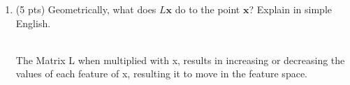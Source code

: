 \documentclass[a4paper]{article}
\theoremstyle{definition}
\def\x{\mathbf x}
\newenvironment{soln}{
    \leavevmode\color{blue}\ignorespaces
}{}
\begin{document}
\begin{enumerate}
\begin{soln}
As L is a diagonal matrix with diagonal $\sqrt{a_{11}}, \ldots, \sqrt{a_{dd}}$,

	\[
L=
  \begin{bmatrix}
    \sqrt{a_{11}} & 0 & 0 & \dots  & 0 \\
    0 & \sqrt{a_{22}} & 0 & \dots  & 0 \\
    \vdots & \vdots & \vdots & \ddots & \vdots \\
    0 & 0 & 0 & \dots  & \sqrt{a_{dd}}
  \end{bmatrix}
\]

 As, $\tilde \x = L\x $, so 
\[
\tilde \x=
  \begin{bmatrix}
    \sqrt{a_{11}}x_{1} \\
    \sqrt{a_{22}}x_{2} \\
    \vdots \\
    \sqrt{a_{dd}}x_{d}
  \end{bmatrix}
\]

$d_I(\tilde \x, \tilde \x')  = \sqrt{(\tilde \x-\tilde \x')^\top A (\tilde \x-\tilde \x')} $ 
\\Since, A = Identity, 
$d_I(\tilde \x, \tilde \x')  = \sqrt{(\tilde \x-\tilde \x')^\top (\tilde \x-\tilde \x')} =  \sqrt{\sum_{i}a_{ii}( x_{i}- x'_{i})^2} $

Looking at the RHS of the equation, 
$$d_A(\x,\x')  = \sqrt{(\x-x')^\top A (\x-x')}$$
\[
A=
  \begin{bmatrix}
    a_{11} & 0 & 0 & \dots  & 0 \\
    0 & a_{22} & 0 & \dots  & 0 \\
    \vdots & \vdots & \vdots & \ddots & \vdots \\
    0 & 0 & 0 & \dots  & a_{dd}
  \end{bmatrix}
\]

the values of L are the square root of those in A. On expanding the above, we get  LHS = RHS = $\sqrt{\sum_{i}a_{ii}( x_{i}- x'_{i})^2} $. Hence LHS = RHS.

\end{soln}

\item (5 pts) Geometrically, what does $L\x$ do to the point $\x$?  Explain in simple English.
\begin{soln}
	\\The Matrix L when multiplied with x, results in increasing or decreasing the values of each feature of x, resulting it to move in the feature space.
\end{soln}


\end{enumerate}
\end{document}
